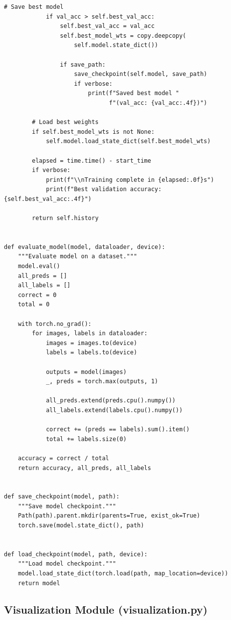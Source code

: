 \documentclass[man,12pt,letterpaper,donotrepeattitle,floatsintext]{apa7}
\begin{document}
\begin{lstlisting}[style=pythonstyle]
            # Save best model
            if val_acc > self.best_val_acc:
                self.best_val_acc = val_acc
                self.best_model_wts = copy.deepcopy(
                    self.model.state_dict())
                
                if save_path:
                    save_checkpoint(self.model, save_path)
                    if verbose:
                        print(f"Saved best model "
                              f"(val_acc: {val_acc:.4f})")
        
        # Load best weights
        if self.best_model_wts is not None:
            self.model.load_state_dict(self.best_model_wts)
        
        elapsed = time.time() - start_time
        if verbose:
            print(f"\\nTraining complete in {elapsed:.0f}s")
            print(f"Best validation accuracy: {self.best_val_acc:.4f}")
        
        return self.history


def evaluate_model(model, dataloader, device):
    """Evaluate model on a dataset."""
    model.eval()
    all_preds = []
    all_labels = []
    correct = 0
    total = 0
    
    with torch.no_grad():
        for images, labels in dataloader:
            images = images.to(device)
            labels = labels.to(device)
            
            outputs = model(images)
            _, preds = torch.max(outputs, 1)
            
            all_preds.extend(preds.cpu().numpy())
            all_labels.extend(labels.cpu().numpy())
            
            correct += (preds == labels).sum().item()
            total += labels.size(0)
    
    accuracy = correct / total
    return accuracy, all_preds, all_labels


def save_checkpoint(model, path):
    """Save model checkpoint."""
    Path(path).parent.mkdir(parents=True, exist_ok=True)
    torch.save(model.state_dict(), path)


def load_checkpoint(model, path, device):
    """Load model checkpoint."""
    model.load_state_dict(torch.load(path, map_location=device))
    return model
\end{lstlisting}

\subsection{Visualization Module (visualization.py)}
\end{document}
